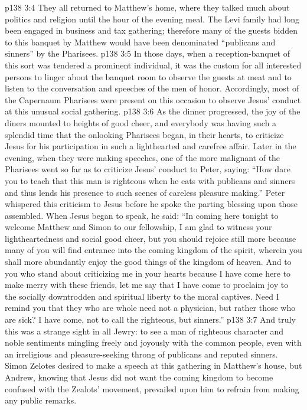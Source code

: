 \vs p138 3:4 \pc They all returned to Matthew’s home, where they talked much about politics and religion until the hour of the evening meal. The Levi family had long been engaged in business and tax gathering; therefore many of the guests bidden to this banquet by Matthew would have been denominated “publicans and sinners” by the Pharisees.
\vs p138 3:5 In those days, when a reception\hyp{}banquet of this sort was tendered a prominent individual, it was the custom for all interested persons to linger about the banquet room to observe the guests at meat and to listen to the conversation and speeches of the men of honor. Accordingly, most of the Capernaum Pharisees were present on this occasion to observe Jesus’ conduct at this unusual social gathering.
\vs p138 3:6 As the dinner progressed, the joy of the diners mounted to heights of good cheer, and everybody was having such a splendid time that the onlooking Pharisees began, in their hearts, to criticize Jesus for his participation in such a lighthearted and carefree affair. Later in the evening, when they were making speeches, one of the more malignant of the Pharisees went so far as to criticize Jesus’ conduct to Peter, saying: “How dare you to teach that this man is righteous when he eats with publicans and sinners and thus lends his presence to such scenes of careless pleasure making.” Peter whispered this criticism to Jesus before he spoke the parting blessing upon those assembled. When Jesus began to speak, he said: \textcolor{ubdarkred}{“In coming here tonight to welcome Matthew and Simon to our fellowship, I am glad to witness your lightheartedness and social good cheer, but you should rejoice still more because many of you will find entrance into the coming kingdom of the spirit, wherein you shall more abundantly enjoy the good things of the kingdom of heaven. And to you who stand about criticizing me in your hearts because I have come here to make merry with these friends, let me say that I have come to proclaim joy to the socially downtrodden and spiritual liberty to the moral captives. Need I remind you that they who are whole need not a physician, but rather those who are sick? I have come, not to call the righteous, but sinners.”}
\vs p138 3:7 And truly this was a strange sight in all Jewry: to see a man of righteous character and noble sentiments mingling freely and joyously with the common people, even with an irreligious and pleasure\hyp{}seeking throng of publicans and reputed sinners. Simon Zelotes desired to make a speech at this gathering in Matthew’s house, but Andrew, knowing that Jesus did not want the coming kingdom to become confused with the Zealots’ movement, prevailed upon him to refrain from making any public remarks.
